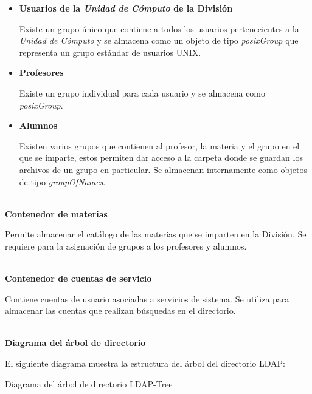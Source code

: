 \begin{itemize}

  \item \textbf{Usuarios de la \textsl{Unidad de C\'{o}mputo} de la Divisi\'{o}n}

  Existe un grupo \'{u}nico que contiene a todos los usuarios pertenecientes a la \textit{Unidad de C\'{o}mputo} y se almacena como un objeto de tipo \textit{posixGroup} que representa un grupo est\'{a}ndar de usuarios \textsc{UNIX}.

  \item \textbf{Profesores}

  Existe un grupo individual para cada usuario y se almacena como \textit{posixGroup}.

  \item \textbf{Alumnos}

  Existen varios grupos que contienen al profesor, la materia y el grupo en el que se imparte, estos permiten dar acceso a la carpeta donde se guardan los archivos de un grupo en particular. Se almacenan internamente como objetos de tipo \textit{groupOfNames}.

\end{itemize}

\textbf{\\ Contenedor de materias \\}

Permite almacenar el cat\'{a}logo de las materias que se imparten en la Divisi\'{o}n. Se requiere para la asignaci\'{o}n de grupos a los profesores y alumnos.

\textbf{\\ Contenedor de cuentas de servicio \\}

Contiene cuentas de usuario asociadas a servicios de sistema. Se utiliza para almacenar las cuentas que realizan b\'{u}squedas en el directorio.

\textbf{\\ Diagrama del \'{a}rbol de directorio \\}

El siguiente diagrama muestra la estructura del \'{a}rbol del directorio \textsc{\gls{LDAP}}:

\diagramblock
{Diagrama del \'{a}rbol de directorio}
{LDAP-Tree}
{
 {
  
 }
}


